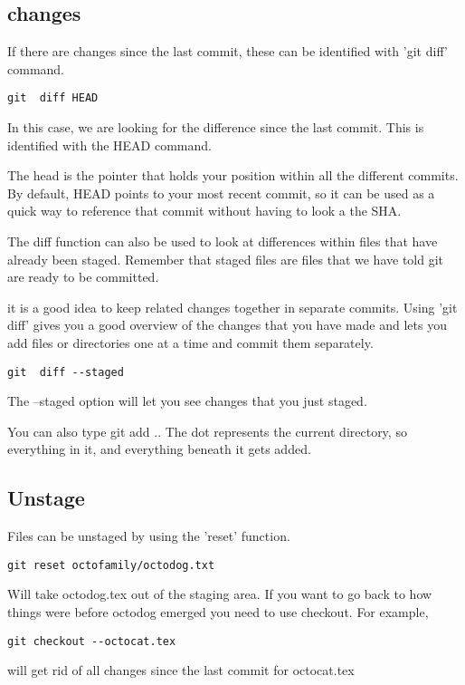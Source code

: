 \documentclass[11pt]{article} %
\begin{document}
\subsection{changes}

If there are changes since the last commit, these can be identified with 'git diff' command. 
\begin{lstlisting}
git  diff HEAD
\end{lstlisting}

In this case, we are looking for the difference since the last commit. This is identified with the HEAD command. 

The head is the pointer that holds your position within all the different commits.  By default, HEAD points to your most recent commit, so it can be used as a quick way to reference that commit without having to look a the SHA.  

The diff function can also be used to look at differences within files that have already been staged.  Remember that staged files are files that we have told git are ready to be committed. 

it is a good idea to keep related changes together in separate commits.  Using 'git diff' gives you a good overview of the changes that you have made and lets you add files or directories one at a time and commit them separately.

\begin{lstlisting}
git  diff --staged
\end{lstlisting}
The --staged option will let you see changes that you just staged.  

You can also type git add .. The dot represents the current directory, so everything in it, and everything beneath it gets added.

\subsection{Unstage}
Files can be unstaged by using the 'reset' function.  

\begin{lstlisting}
git reset octofamily/octodog.txt  
\end{lstlisting}
Will take octodog.tex out of the staging area.  If you want to go back to how things were before octodog emerged you need to use checkout. For example, 
\begin{lstlisting}
git checkout --octocat.tex
\end{lstlisting}
will get rid of all changes since the last commit for octocat.tex
\end{document}
